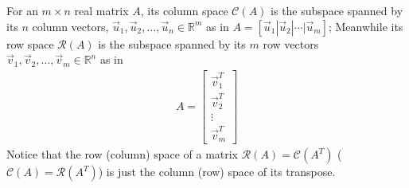 \begin{defn}
\label{defn:colrowspace}
For an $m \times n$ real matrix $A$, its column space $\mathcal{C}(A)$ is the subspace spanned by its $n$ column vectors, $\vec{u}_1, \vec{u}_2, \ldots, \vec{u}_n \in \mathbb{R}^m$ as in $A = [\vec{u}_1|\vec{u}_2|\cdots|\vec{u}_m]$; Meanwhile its row space $\mathcal{R}(A)$ is the subspace spanned by its $m$ row vectors $\vec{v}_1, \vec{v}_2, \ldots, \vec{v}_m \in \mathbb{R}^n$ as in
\begin{align*}
A = 
\left[\begin{array}{c}
\vec{v}_1^T \\
\hline
\vec{v}_2^T \\
\hline
\vdots \\
\hline
\vec{v}_m^T
\end{array}\right]
\end{align*}
Notice that the row (column) space of a matrix $\mathcal{R}(A) = \mathcal{C}(A^T)$ ($\mathcal{C}(A) = \mathcal{R}(A^T)$) is just the column (row) space of its transpose. 
\end{defn}

